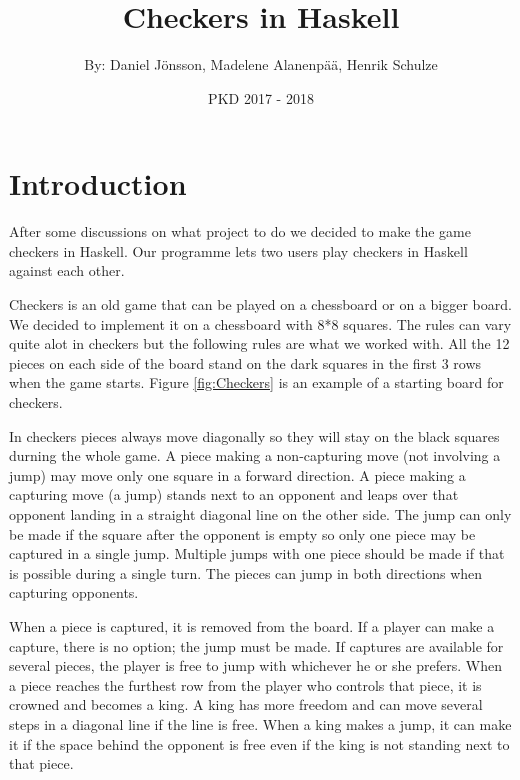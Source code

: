 \documentclass[12pt,a4paper]{article}
\title{Checkers in Haskell}
\author{By: Daniel Jönsson, Madelene Alanenpää, Henrik Schulze }
\date{PKD 2017 - 2018}
\begin{document}
\maketitle
\newpage
\tableofcontents
\newpage

\section{Introduction}
After some discussions on what project to do we decided to make the game checkers in Haskell. Our programme lets two users play checkers in Haskell against each other. 

Checkers is an old game that can be played on a chessboard or on a bigger board. We decided to implement it on a chessboard with 8*8 squares. The rules can vary quite alot in checkers but the following rules are what we worked with. All the 12 pieces on each side of the board stand on the dark squares in the first 3 rows when the game starts. Figure \ref{fig:Checkers} is an example of a starting board for checkers.

In checkers pieces always move diagonally so they will stay on the black squares durning the whole game. A piece making a non-capturing move (not involving a jump) may move only one square in a forward direction. A piece making a capturing move (a jump) stands next to an opponent and leaps over that opponent landing in a straight diagonal line on the other side. The jump can only be made if the square after the opponent is empty so only one piece may be captured in a single jump. Multiple jumps with one piece should be made if that is possible during a single turn. The pieces can jump in both directions when capturing opponents.

When a piece is captured, it is removed from the board. If a player can make a capture, there is no option; the jump must be made. If captures are available for several pieces, the player is free to jump with whichever he or she prefers. When a piece reaches the furthest row from the player who controls that piece, it is crowned and becomes a king. A king has more freedom and can move several steps in a diagonal line if the line is free. When a king makes a jump, it can make it if the space behind the opponent is free even if the king is not standing next to that piece.
\end{document}
